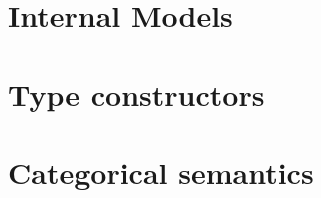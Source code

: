 \documentclass{article}
\begin{document}
\part{Internal Models}\label{part:models}



%

\part{Type constructors}








%

%

%

%

\part{Categorical semantics}







\end{document}
